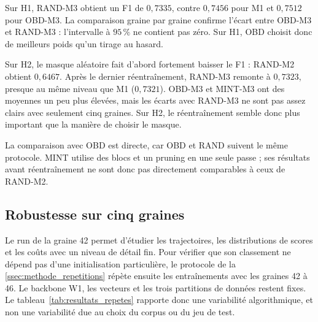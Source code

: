 Sur H1, RAND-M3 obtient un F1 de $0{,}7335$, contre $0{,}7456$ pour M1 et
$0{,}7512$ pour OBD-M3. La comparaison graine par graine confirme l'écart entre
OBD-M3 et RAND-M3 : l'intervalle à $95\,\%$ ne contient pas zéro. Sur H1, OBD
choisit donc de meilleurs poids qu'un tirage au hasard.

Sur H2, le masque aléatoire fait d'abord fortement baisser le F1 : RAND-M2
obtient $0{,}6467$. Après le dernier réentraînement, RAND-M3 remonte à
$0{,}7323$, presque au même niveau que M1 ($0{,}7321$). OBD-M3 et MINT-M3 ont
des moyennes un peu plus élevées, mais les écarts avec RAND-M3 ne sont pas assez
clairs avec seulement cinq graines. Sur H2, le réentraînement semble donc plus
important que la manière de choisir le masque.

La comparaison avec OBD est directe, car OBD et RAND suivent le même protocole.
MINT utilise des blocs et un pruning en une seule passe ; ses résultats avant
réentraînement ne sont donc pas directement comparables à ceux de RAND-M2.

\subsection{Robustesse sur cinq graines}
\label{ssec:resultats_repetitions}

Le run de la graine 42 permet d'étudier les trajectoires, les distributions de
scores et les coûts avec un niveau de détail fin. Pour vérifier que son
classement ne dépend pas d'une initialisation particulière, le protocole de la
\autoref{ssec:methode_repetitions} répète ensuite les entraînements avec les
graines 42 à 46. Le backbone W1, les vecteurs et les trois partitions de données
restent fixes. Le tableau~\ref{tab:resultats_repetes} rapporte donc une
variabilité algorithmique, et non une variabilité due au choix du corpus ou du
jeu de test.

